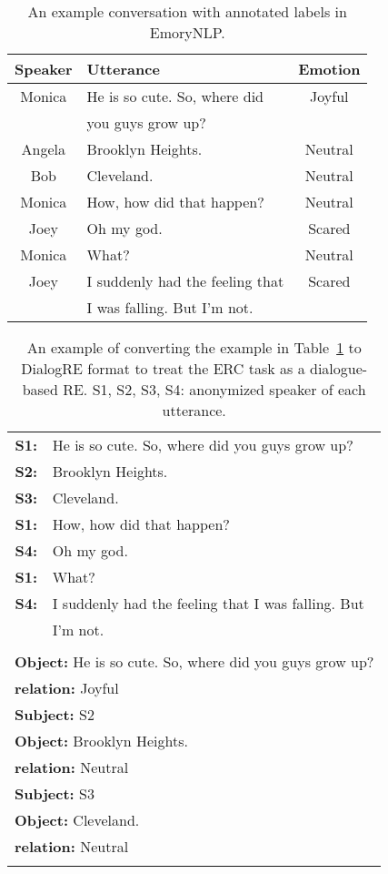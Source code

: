 \documentclass[11pt]{article}
\begin{document}
\begin{table}
\centering
{\small
\begin{tabular}{clc}
\hline \textbf{Speaker} & \textbf{Utterance} & \textbf{Emotion} \\ \hline
Monica & He is so cute. So, where did & Joyful \\
& you guys grow up? & \\
Angela & Brooklyn Heights. & Neutral \\
Bob & Cleveland. & Neutral \\
Monica & How, how did that happen? & Neutral \\
Joey & Oh my god. & Scared \\
Monica & What? & Neutral \\
Joey & I suddenly had the feeling that & Scared \\
& I was falling. But I'm not. & \\
\hline
\end{tabular}
}
\caption{\label{EmoryNLP-table} An example conversation with annotated labels in EmoryNLP\citep{DBLP:conf/aaai/ZahiriC18}.}
\end{table}

\begin{table}
\centering
{\small
\begin{tabular}{cl}
\Xhline{3\arrayrulewidth}
\textbf{S1:} & He is so cute. So, where did you guys grow up? \\
\textbf{S2:} & Brooklyn Heights. \\
\textbf{S3:} & Cleveland. \\
\textbf{S1:} & How, how did that happen? \\
\textbf{S4:} & Oh my god. \\
\textbf{S1:} & What? \\
\textbf{S4:} & I suddenly had the feeling that I was falling. But \\
& I'm not. \\
\Xhline{2\arrayrulewidth}
\multicolumn{2}{l}{\textbf{Subject:} S1} \\
\multicolumn{2}{l}{\textbf{Object:} He is so cute. So, where did you guys grow up?} \\
\multicolumn{2}{l}{\textbf{relation:} Joyful} \\
\hline
\multicolumn{2}{l}{\textbf{Subject:} S2} \\
\multicolumn{2}{l}{\textbf{Object:} Brooklyn Heights.} \\
\multicolumn{2}{l}{\textbf{relation:} Neutral} \\
\hline
\multicolumn{2}{l}{\textbf{Subject:} S3} \\
\multicolumn{2}{l}{\textbf{Object:} Cleveland.} \\
\multicolumn{2}{l}{\textbf{relation:} Neutral} \\
\Xhline{3\arrayrulewidth}
\end{tabular}
}
\caption{\label{erd2dialogRE-table} An example of converting the example in Table~\ref{EmoryNLP-table} to DialogRE format to treat the ERC task as a dialogue-based RE. S1, S2, S3, S4: anonymized speaker of each utterance.}
\end{table}
\end{document}
